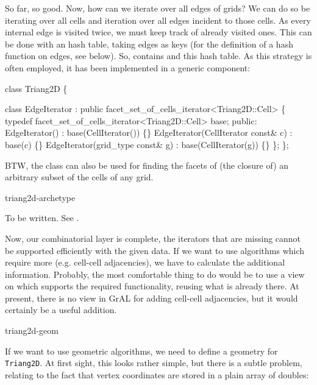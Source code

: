 So far, so good. Now, how can we iterate over all
edges of  grids?
We can do so be iterating over all cells and iteration over
all edges incident to those cells.
As every internal edge is visited twice,
we must keep track of already visited ones.
This can be done with an hash table, taking edges as keys
(for the definition of  a hash function on edges, see below).
So,  contains 
 and this hash table.
As this strategy is often employed, it has been
implemented in a generic component:

\begin{example}
class Triang2D \{

   class EdgeIterator 
    : public facet_set_of_cells_iterator<Triang2D::Cell>
   \{
     typedef facet_set_of_cells_iterator<Triang2D::Cell> base;
    public: 
     EdgeIterator() : base(CellIterator()) \{\}
     EdgeIterator(CellIterator  const& c) : base(c) \{\}
     EdgeIterator(grid_type const& g)  : base(CellIterator(g)) \{\}
  \};
\};
\end{example}
BTW, the class 
can also be used for finding the facets of (the closure of)
an arbitrary subset of the cells of any grid.

\begin{Label}{triang2d-archetype}

To be written.  See .
\end{Label}

Now, our combinatorial layer is complete, 
the iterators that are missing cannot be supported efficiently
with the given data.
If we want to use algorithms which require more (e.g. cell-cell 
adjacencies), we have to calculate the additional information.
Probably, the most comfortable thing to do would be
to use a view on  which supports the 
required functionality, reusing what is already there.
At present, there is no view in GrAL 
for adding cell-cell adjacencies, but it would certainly be 
a useful addition.

\begin{Label}{triang2d-geom}
\end{Label}


If we want to use geometric algorithms,
we need to define a geometry for \texttt{Triang2D}.
At first sight, this looks rather simple,
but there is a subtle problem, 
relating to the fact that vertex coordinates are stored 
in a plain array of doubles:


